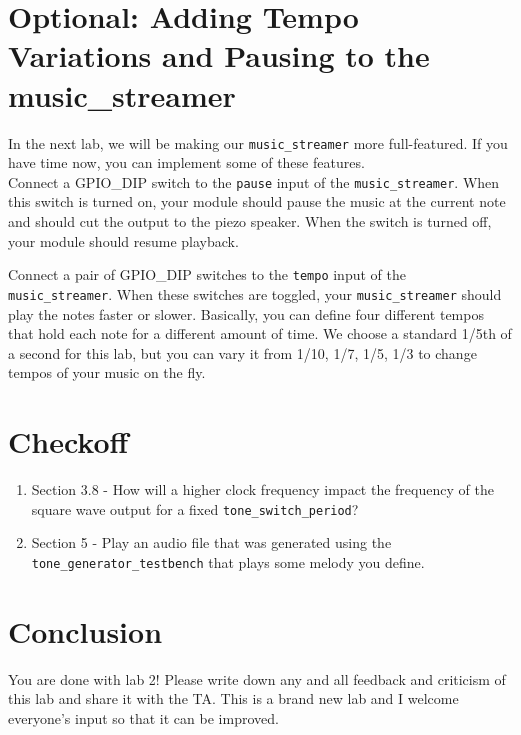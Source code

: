 \documentclass[11pt]{article}
\begin{document}
\section{Optional: Adding Tempo Variations and Pausing to the music\_streamer}
In the next lab, we will be making our \verb|music_streamer| more full-featured. If you have time now, you can implement some of these features.\\

Connect a GPIO\_DIP switch to the \verb|pause| input of the \verb|music_streamer|. When this switch is turned on, your module should pause the music at the current note and should cut the output to the piezo speaker. When the switch is turned off, your module should resume playback.

Connect a pair of GPIO\_DIP switches to the \verb|tempo| input of the \verb|music_streamer|. When these switches are toggled, your \verb|music_streamer| should play the notes faster or slower. Basically, you can define four different tempos that hold each note for a different amount of time. We choose a standard 1/5th of a second for this lab, but you can vary it from 1/10, 1/7, 1/5, 1/3 to change tempos of your music on the fly.

\section{Checkoff}
\begin{enumerate}
	\item Section 3.8 - How will a higher clock frequency impact the frequency of the square wave output for a fixed \verb|tone_switch_period|?
	\item Section 5 - Play an audio file that was generated using the \verb|tone_generator_testbench| that plays some melody you define.
\end{enumerate}

\section{Conclusion}
You are done with lab 2! Please write down any and all feedback and criticism of this lab and share it with the TA. This is a brand new lab and I welcome everyone's input so that it can be improved.
\end{document}
